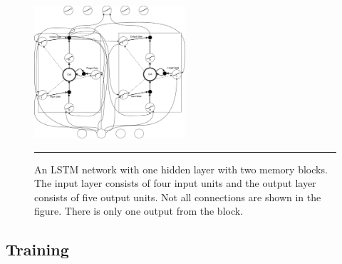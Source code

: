 \begin{figure}[htbp]
  \centering
    \includegraphics[width=0.5\textwidth,height=0.5\textheight,keepaspectratio]{Figures/lstm-network.pdf}
    \rule{35em}{0.5pt}
  \caption[An LSTM network]
{An LSTM network with one hidden layer with two memory blocks. The input layer consists of
four input units and the output layer consists of five output units. Not all connections are
shown in the figure. There is only one output from the block.}
  \label{fig:lstmNetwork}
\end{figure}

\subsection{Training}


